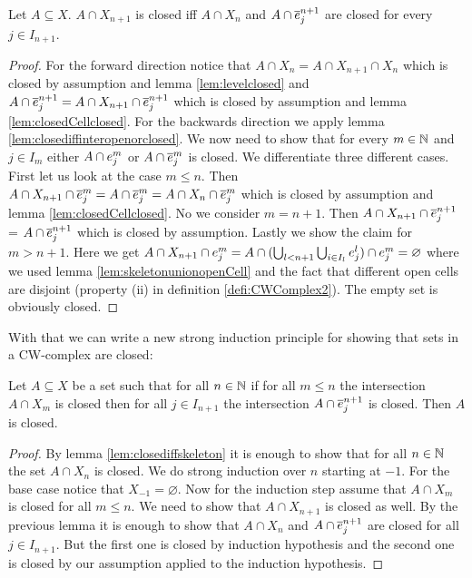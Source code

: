 \begin{lem}
    Let $A \subseteq X$. $A \cap X_{n + 1}$ is closed iff $A \cap X_n$ and $A \cap \closedCell{n + 1}{j}$ are closed for every $j \in I_{n + 1}$.
\end{lem}
\begin{proof}
    For the forward direction notice that $A \cap X_n = A \cap X_{n + 1} \cap X_n$ which is closed by assumption and lemma \ref{lem:levelclosed} and $A \cap \closedCell{n + 1}{j} = A \cap X_{n + 1} \cap \closedCell{n + 1}{j}$ which is closed by assumption and lemma \ref{lem:closedCellclosed}.
    For the backwards direction we apply lemma \ref{lem:closediffinteropenorclosed}. 
    We now need to show that for every $m \in \bN$ and $j \in I_m$ either $A \cap \openCell{m}{j}$ or $A \cap \closedCell{m}{j}$ is closed. 
    We differentiate three different cases. 
    First let us look at the case $m \le n$.
    Then $A \cap X_{n + 1} \cap \closedCell{m}{j} = A \cap \closedCell{m}{j} = A \cap X_n \cap \closedCell{m}{j}$ which is closed by assumption and lemma \ref{lem:closedCellclosed}. 
    No we consider $m = n + 1$. 
    Then $A \cap X_{n + 1} \cap \closedCell{n + 1}{j}$ = $A \cap \closedCell{n + 1}{j}$ which is closed by assumption. 
    Lastly we show the claim for $m > n + 1$. 
    Here we get $A \cap X_{n + 1} \cap \openCell{m}{j} = A \cap (\bigcup_{l < n + 1}\bigcup_{i \in I_l}\openCell{l}{j} ) \cap \openCell{m}{j} = \varnothing$ where we used lemma \ref{lem:skeletonunionopenCell} and the fact that different open cells are disjoint (property (ii) in definition \ref{defi:CWComplex2}). 
    The empty set is obviously closed.
\end{proof}

With that we can write a new strong induction principle for showing that sets in a CW-complex are closed: 

\begin{lem}
    Let $A \subseteq X$ be a set such that for all $n \in \bN$ if for all $m \le n$ the intersection $A \cap X_m$ is closed then for all $j \in I_{n + 1}$ the intersection $A \cap \closedCell{n + 1}{j}$ is closed. 
    Then $A$ is closed.
\end{lem}
\begin{proof}
    By lemma \ref{lem:closediffskeleton} it is enough to show that for all $n \in \bN$ the set $A \cap X_n$ is closed. 
    We do strong induction over $n$ starting at $-1$. 
    For the base case notice that $X_{-1} = \varnothing$.
    Now for the induction step assume that $A \cap X_m$ is closed for all $m \le n$. 
    We need to show that $A \cap X_{n + 1}$ is closed as well. 
    By the previous lemma it is enough to show that $A \cap X_n$ and $A \cap \closedCell{n + 1}{j}$ are closed for all $j \in I_{n + 1}$. 
    But the first one is closed by induction hypothesis and the second one is closed by our assumption applied to the induction hypothesis.
\end{proof}
